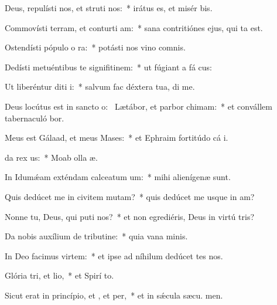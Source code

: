 \item Deus, repulísti nos, et struti nos:~* irátus es, et misér  bis.
\item Commovísti terram, et conturti am:~* sana contritiónes ejus, qui ta est.
\item Ostendísti pópulo o ra:~* potásti nos vino comnis.
\item Dedísti metuéntibus te signifitinem:~* ut fúgiant a fá cus:
\item Ut liberéntur diti i:~* salvum fac déxtera tua,  di me.
\item Deus locútus est in sancto o:~\pscross{} Lætábor, et parbor chimam:~* et convállem tabernaculó bor.
\item Meus est Gálaad, et meus  Mases:~* et Ephraim fortitúdo cá i.
\item {}da rex us:~* Moab olla  æ.
\item In Idumǽam exténdam calceatum um:~* mihi alienígenæ  sunt.
\item Quis dedúcet me in civitem mutam?~* quis dedúcet me usque in am?
\item Nonne tu, Deus, qui puti nos?~* et non egrediéris, Deus in virtú tris?
\item Da nobis auxílium de tributine:~* quia vana  minis.
\item In Deo facimus virtem:~* et ipse ad níhilum dedúcet tes nos.
\item Glória tri, et lio,~* et Spirí to.
\item Sicut erat in princípio, et , et per,~* et in sǽcula sæcu. men.
